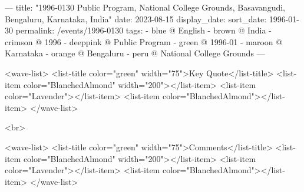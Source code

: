 ---
title: "1996-0130 Public Program, National College Grounds, Basavangudi, Bengaluru, Karnataka, India"
date: 2023-08-15
display_date: 
sort_date: 1996-01-30
permalink: /events/1996-0130
tags:
  - blue @ English
  - brown @ India
  - crimson @ 1996
  - deeppink @ Public Program
  - green @ 1996-01
  - maroon @ Karnataka
  - orange @ Bengaluru
  - peru @ National College Grounds
---

<wave-list>
  <list-title color="green" width="75">Key Quote</list-title>
  <list-item color="BlanchedAlmond"  width="200"></list-item>
  <list-item color="Lavender"></list-item>
  <list-item color="BlanchedAlmond"></list-item>
</wave-list>

<br>

<wave-list>
  <list-title color="green" width="75">Comments</list-title>
  <list-item color="BlanchedAlmond"  width="200"></list-item>
  <list-item color="Lavender"></list-item>
  <list-item color="BlanchedAlmond"></list-item>
</wave-list>